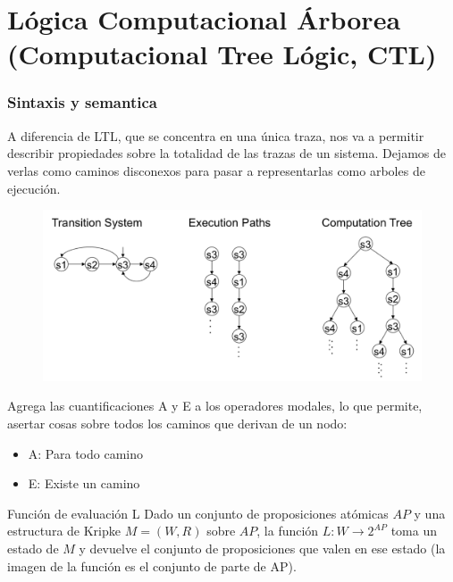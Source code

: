\newpage
\part{Lógica Computacional Árborea (Computacional Tree Lógic, CTL)}
\section{Sintaxis y semantica}
A diferencia de LTL, que se concentra en una única traza, nos va a permitir describir propiedades sobre la totalidad de las trazas de un sistema. Dejamos de verlas como caminos disconexos para pasar a representarlas como arboles de ejecución.

\begin{figure}[h]
\centering
	\includegraphics[scale=0.25]{imagenes/ctl-ltl-comparison}
\end{figure}

Agrega las cuantificaciones A y E a los operadores modales, lo que permite, asertar cosas sobre todos los caminos que derivan de un nodo:
\begin{itemize}
\item A: Para todo camino
\item E: Existe un camino
\end{itemize}

\begin{definicion}{Función de evaluación L}
Dado un conjunto de proposiciones atómicas $AP$ y una estructura de Kripke $M=(W,R)$ sobre $AP$, la función $L:W\to 2^{AP}$ toma un estado de $M$ y devuelve el conjunto de proposiciones que valen en ese estado (la imagen de la función es el conjunto de parte de AP).
\end{definicion}
